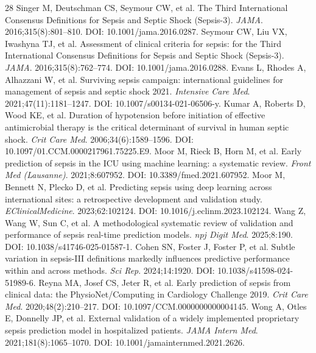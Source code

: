 \documentclass[10pt,twocolumn,a4paper]{article}
\begin{document}
\vspace{-0.2em}
\begin{thebibliography}{28}
\fontsize{5.8pt}{6.9pt}\selectfont
\setlength{\itemsep}{0pt}
\setlength{\parsep}{0pt}
\setlength{\parskip}{0pt}
 Singer M, Deutschman CS, Seymour CW, et al. The Third International Consensus Definitions for Sepsis and Septic Shock (Sepsis-3). \textit{JAMA}. 2016;315(8):801--810. DOI: 10.1001/jama.2016.0287.
 Seymour CW, Liu VX, Iwashyna TJ, et al. Assessment of clinical criteria for sepsis: for the Third International Consensus Definitions for Sepsis and Septic Shock (Sepsis-3). \textit{JAMA}. 2016;315(8):762--774. DOI: 10.1001/jama.2016.0288.
 Evans L, Rhodes A, Alhazzani W, et al. Surviving sepsis campaign: international guidelines for management of sepsis and septic shock 2021. \textit{Intensive Care Med}. 2021;47(11):1181--1247. DOI: 10.1007/s00134-021-06506-y.
 Kumar A, Roberts D, Wood KE, et al. Duration of hypotension before initiation of effective antimicrobial therapy is the critical determinant of survival in human septic shock. \textit{Crit Care Med}. 2006;34(6):1589--1596. DOI: 10.1097/01.CCM.0000217961.75225.E9.
 Moor M, Rieck B, Horn M, et al. Early prediction of sepsis in the ICU using machine learning: a systematic review. \textit{Front Med (Lausanne)}. 2021;8:607952. DOI: 10.3389/fmed.2021.607952.
 Moor M, Bennett N, Plecko D, et al. Predicting sepsis using deep learning across international sites: a retrospective development and validation study. \textit{EClinicalMedicine}. 2023;62:102124. DOI: 10.1016/j.eclinm.2023.102124.
 Wang Z, Wang W, Sun C, et al. A methodological systematic review of validation and performance of sepsis real-time prediction models. \textit{npj Digit Med}. 2025;8:190. DOI: 10.1038/s41746-025-01587-1.
 Cohen SN, Foster J, Foster P, et al. Subtle variation in sepsis-III definitions markedly influences predictive performance within and across methods. \textit{Sci Rep}. 2024;14:1920. DOI: 10.1038/s41598-024-51989-6.
 Reyna MA, Josef CS, Jeter R, et al. Early prediction of sepsis from clinical data: the PhysioNet/Computing in Cardiology Challenge 2019. \textit{Crit Care Med}. 2020;48(2):210--217. DOI: 10.1097/CCM.0000000000004145.
 Wong A, Otles E, Donnelly JP, et al. External validation of a widely implemented proprietary sepsis prediction model in hospitalized patients. \textit{JAMA Intern Med}. 2021;181(8):1065--1070. DOI: 10.1001/jamainternmed.2021.2626.

\end{thebibliography}
\end{document}
